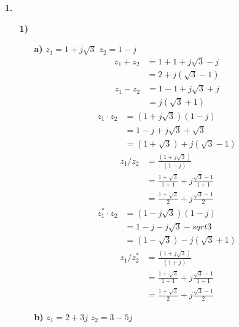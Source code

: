\documentclass[a4paper,11pt]{article}
\author{\authorinfotitle}
\title{\titleinfo}
\date{\today}
\begin{document}
	\maketitle
	\begin{enumerate}
		\item[\textbf{1.}]
		\begin{enumerate}
			\item[\textbf{1)}]
			\begin{enumerate}
			\item[\textbf{a)}] $z_1 = 1+j\sqrt{3}$ $z_2=1-j$
			\begin{align*}
			z_1+z_2 &= 1+1+j\sqrt{3}-j \\
					&= 2+j(\sqrt{3}-1)
			\end{align*}
			\begin{align*}
			z_1-z_2 &= 1-1+j\sqrt{3}+j \\
					&= j(\sqrt{3}+1)
			\end{align*}			
			\begin{align*}
			z_1 \cdot z_2 &= (1+j\sqrt{3})(1-j) \\
			              &= 1-j+j\sqrt{3}+\sqrt{3} \\
			              &= (1+\sqrt{3})+j(\sqrt{3}-1)
			\end{align*}
			\begin{align*}
			z_1 / z_2 &= \frac{(1+j\sqrt{3})}{(1-j)} \\
			          &= \frac{1+\sqrt{3}}{1+1}+j\frac{\sqrt{3}-1}{1+1} \\
			          &= \frac{1+\sqrt{3}}{2}+j\frac{\sqrt{3}-1}{2}
			\end{align*}
			\begin{align*}
			z_1^* \cdot z_2 &= (1-j\sqrt{3})(1-j) \\
			              &= 1-j-j\sqrt{3}-sqrt{3} \\
			              &= (1-\sqrt{3})-j(\sqrt{3}+1)
			\end{align*}
			\begin{align*}
			z_1 / z_2^* &= \frac{(1+j\sqrt{3})}{(1+j)} \\
			            &= \frac{1+\sqrt{3}}{1+1}+j\frac{\sqrt{3}-1}{1+1} \\
			            &= \frac{1+\sqrt{3}}{2}+j\frac{\sqrt{3}-1}{2}
			\end{align*}
			\item[\textbf{b)}] $z_1 = 2+3j$ $z_2=3-5j$
			

\end{enumerate}
\end{enumerate}
\end{enumerate}
\end{document}
